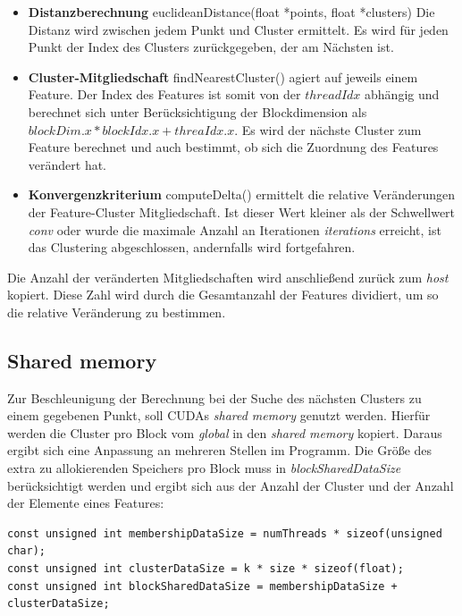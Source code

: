 \begin{itemize}
	\item \textbf{Distanzberechnung} euclideanDistance(float *points, float *clusters) Die Distanz wird zwischen jedem Punkt und Cluster ermittelt. Es wird für jeden Punkt der Index des Clusters zurückgegeben, der am Nächsten ist.
	\item \textbf{Cluster-Mitgliedschaft} findNearestCluster() agiert auf jeweils einem Feature. Der Index des Features ist somit von der $threadIdx$ abhängig und berechnet sich unter Berücksichtigung der Blockdimension als $blockDim.x * blockIdx.x + threaIdx.x$. Es wird der nächste Cluster zum Feature berechnet und auch bestimmt, ob sich die Zuordnung des Features verändert hat.
	\item \textbf{Konvergenzkriterium} computeDelta() ermittelt die relative Veränderungen der Feature-Cluster Mitgliedschaft. Ist dieser Wert kleiner als der Schwellwert \textit{conv} oder wurde die maximale Anzahl an Iterationen \textit{iterations} erreicht, ist das Clustering abgeschlossen, andernfalls wird fortgefahren.
\end{itemize}

Die Anzahl der veränderten Mitgliedschaften wird anschließend zurück zum \textit{host} kopiert. Diese Zahl wird durch die Gesamtanzahl der Features dividiert, um so die relative Veränderung zu bestimmen. 

\subsection{Shared memory}

Zur Beschleunigung der Berechnung bei der Suche des nächsten Clusters zu einem gegebenen Punkt, soll CUDAs \textit{shared memory} genutzt werden. Hierfür werden die Cluster pro Block vom \textit{global} in den \textit{shared memory} kopiert. Daraus ergibt sich eine Anpassung an mehreren Stellen im Programm.  Die Größe des extra zu allokierenden Speichers pro Block muss in \textit{blockSharedDataSize} berücksichtigt werden und ergibt sich aus der Anzahl der Cluster und der Anzahl der Elemente eines Features:

\lstset{language=C}
\begin{lstlisting}
const unsigned int membershipDataSize = numThreads * sizeof(unsigned char);
const unsigned int clusterDataSize = k * size * sizeof(float);
const unsigned int blockSharedDataSize = membershipDataSize + clusterDataSize;
\end{lstlisting}

